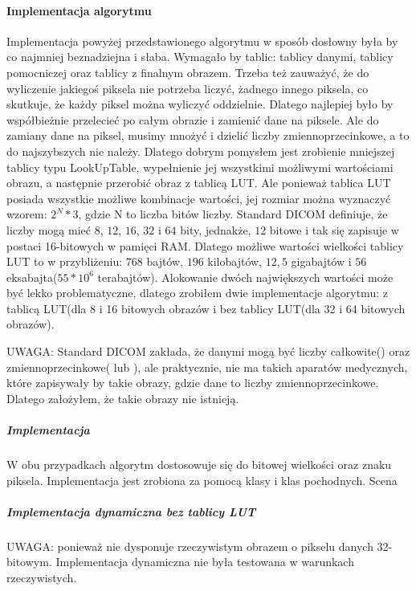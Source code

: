 \paragraph{Implementacja algorytmu}

Implementacja powyżej przedstawionego algorytmu w sposób dosłowny była by co najmniej beznadziejna i słaba.
Wymagało by tablic: tablicy danymi, tablicy pomocniczej oraz tablicy z finalnym obrazem.
Trzeba też zauważyć, że do wyliczenie jakiegoś piksela nie potrzeba liczyć, żadnego innego piksela, co skutkuje, że każdy piksel można wyliczyć oddzielnie.
Dlatego najlepiej było by współbieżnie przelecieć po całym obrazie i zamienić dane na piksele.
Ale do zamiany dane na piksel, musimy mnożyć i dzielić liczby zmiennoprzecinkowe, a to do najszybszych nie należy.
Dlatego dobrym pomysłem jest zrobienie mniejszej tablicy typu LookUpTable, wypełnienie jej wszystkimi możliwymi wartościami obrazu, a następnie przerobić obraz z tablicą LUT.
Ale ponieważ tablica LUT posiada wszystkie możliwe kombinacje wartości, jej rozmiar można wyznaczyć wzorem: $2^N*3$, gdzie N to liczba bitów liczby.
Standard DICOM definiuje, że liczby mogą mieć $8$, $12$, $16$, $32$ i $64$ bity, jednakże, $12$ bitowe i tak się zapisuje w postaci 16-bitowych w pamięci RAM.
Dlatego możliwe wartości wielkości tablicy LUT to w przybliżeniu: $768$ bajtów, $196$ kilobajtów, $12,5$ gigabajtów i $56$ eksabajta($55*10^{6}$ terabajtów).
Alokowanie dwóch największych wartości może być lekko problematyczne, dlatego zrobiłem dwie implementacje algorytmu: z tablicą LUT(dla 8 i 16 bitowych obrazów i bez tablicy LUT(dla 32 i 64 bitowych obrazów).

UWAGA: Standard DICOM zakłada, że danymi mogą być liczby całkowite() oraz zmiennoprzecinkowe( lub ), ale praktycznie, nie ma takich aparatów medycznych, które zapisywały by takie obrazy, gdzie dane to liczby zmiennoprzecinkowe. Dlatego założyłem, że takie obrazy nie istnieją.

\subparagraph{Implementacja}

W obu przypadkach algorytm dostosowuje się do bitowej wielkości oraz znaku piksela.
Implementacja jest zrobiona za pomocą klasy  i klas pochodnych.
Scena 

\subparagraph{Implementacja dynamiczna bez tablicy LUT}

UWAGA: ponieważ nie dysponuje rzeczywistym obrazem o pikselu danych 32-bitowym.
Implementacja dynamiczna nie była testowana w warunkach rzeczywistych.




